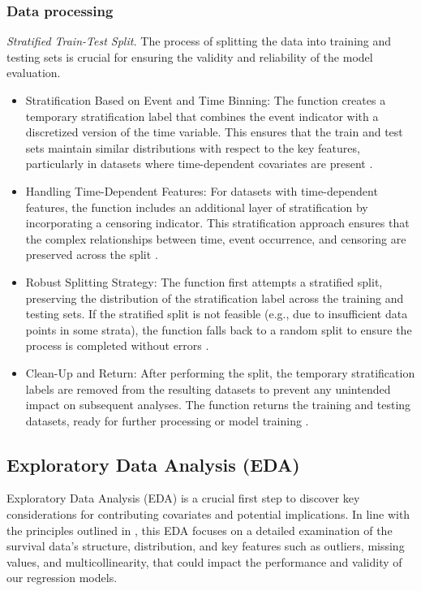 \subsubsection*{Data processing}
\noindent \textit{Stratified Train-Test Split.} The process of splitting the data into training and testing sets is crucial for ensuring the validity and reliability of the model evaluation. 
\begin{itemize}
    \item Stratification Based on Event and Time Binning: The function creates a temporary stratification label that combines the event indicator with a discretized version of the time variable. This ensures that the train and test sets maintain similar distributions with respect to the key features, particularly in datasets where time-dependent covariates are present \parencite{woo_time_2023}.
    \item Handling Time-Dependent Features: For datasets with time-dependent features, the function includes an additional layer of stratification by incorporating a censoring indicator. This stratification approach ensures that the complex relationships between time, event occurrence, and censoring are preserved across the split \parencite{ichida_evaluation_1993}.
    \item Robust Splitting Strategy: The function first attempts a stratified split, preserving the distribution of the stratification label across the training and testing sets. If the stratified split is not feasible (e.g., due to insufficient data points in some strata), the function falls back to a random split to ensure the process is completed without errors \parencite{scikit-learn}.
    \item Clean-Up and Return: After performing the split, the temporary stratification labels are removed from the resulting datasets to prevent any unintended impact on subsequent analyses. The function returns the training and testing datasets, ready for further processing or model training \parencite{scikit-learn}.
\end{itemize}



\subsection{Exploratory Data Analysis (EDA)}

Exploratory Data Analysis (EDA) is a crucial first step to discover key considerations for contributing covariates and potential implications. In line with the principles outlined in \parencite{harrell__regression_2015}, this EDA focuses on a detailed examination of the survival data's structure, distribution, and key features such as outliers, missing values, and multicollinearity, that could impact the performance and validity of our regression models.

